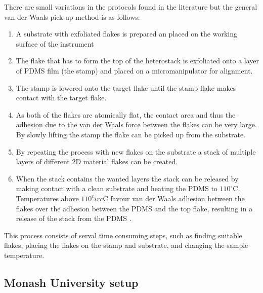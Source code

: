 \documentclass[10pt]{article}
\begin{document}
There are small variations in the protocols found in the literature but the general van der Waals pick-up method is as follows:
\begin{enumerate}[noitemsep]
\item A substrate with exfoliated flakes is prepared an placed on the working surface of the instrument
\item The flake that has to form the top of the heterostack is exfoliated onto a layer of PDMS film (the stamp) and placed on a micromanipulator for alignment.
\item The stamp is lowered onto the target flake until the stamp flake makes contact with the target flake.
\item As both of the flakes are atomically flat, the contact area and thus the adhesion due to the van der Waals force between the flakes can be very large.
By slowly lifting the stamp the flake can be picked up from the substrate.
\item By repeating the process with new flakes on the substrate a stack of multiple layers of different 2D material flakes can be created.
\item When the stack contains the wanted layers the stack can be released by making contact with a clean substrate and heating the PDMS to $110^\circ$C.
Temperatures above $110^circ$C favour van der Waals adhesion between the flakes over the adhesion between the PDMS and the top flake, resulting in a release of the stack from the PDMS \cite{pizzoccheroHotPickupTechnique2016}.
\end{enumerate}

 This process consists of serval time consuming steps, such as finding suitable flakes, placing the flakes on the stamp and substrate, and changing the sample temperature.


\subsection{Monash University setup}
\end{document}
